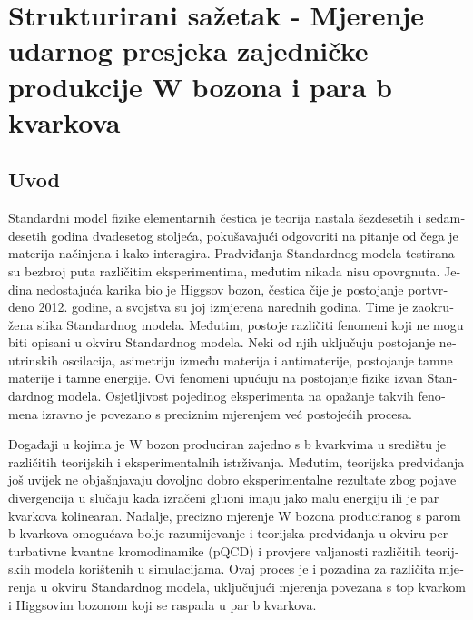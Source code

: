 
\chapter{Strukturirani sažetak - Mjerenje udarnog presjeka zajedničke produkcije W bozona i para b kvarkova} %

\label{Chapter9} %

\begin{otherlanguage}{croatian}

\section{Uvod}
Standardni model fizike elementarnih čestica je teorija nastala šezdesetih i sedamdesetih godina dvadesetog stoljeća, pokušavajući odgovoriti na pitanje od čega je materija načinjena i kako interagira. Pradviđanja Standardnog modela testirana su bezbroj puta različitim eksperimentima, međutim nikada nisu opovrgnuta. Jedina nedostajuća karika bio je Higgsov bozon, čestica čije je postojanje portvrđeno 2012. godine, a svojstva su joj izmjerena narednih godina. Time je zaokružena slika Standardnog modela. Međutim, postoje različiti fenomeni koji ne mogu biti opisani u okviru Standardnog modela. Neki od njih uključuju postojanje neutrinskih oscilacija, asimetriju između materija i antimaterije, postojanje tamne materije i tamne energije. Ovi fenomeni upućuju na postojanje fizike izvan Standardnog modela. Osjetljivost pojedinog eksperimenta na opažanje takvih fenomena izravno je povezano s preciznim mjerenjem već postojećih procesa. 

Događaji u kojima je W bozon produciran zajedno s b kvarkvima u središtu je različitih teorijskih i eksperimentalnih istrživanja. Međutim, teorijska predviđanja još uvijek ne objašnjavaju dovoljno dobro  eksperimentalne rezultate zbog pojave divergencija u slučaju kada izračeni gluoni imaju jako malu energiju ili je par kvarkova kolinearan. Nadalje, precizno mjerenje W bozona produciranog s parom b kvarkova omogućava bolje razumijevanje i teorijska predviđanja u okviru perturbativne kvantne kromodinamike (pQCD) i provjere valjanosti različitih teorijskih modela korištenih u simulacijama. Ovaj proces je i pozadina za različita mjerenja u okviru Standardnog modela, uključujući mjerenja povezana s top kvarkom i Higgsovim bozonom koji se raspada u par b kvarkova. 


\end{otherlanguage}
